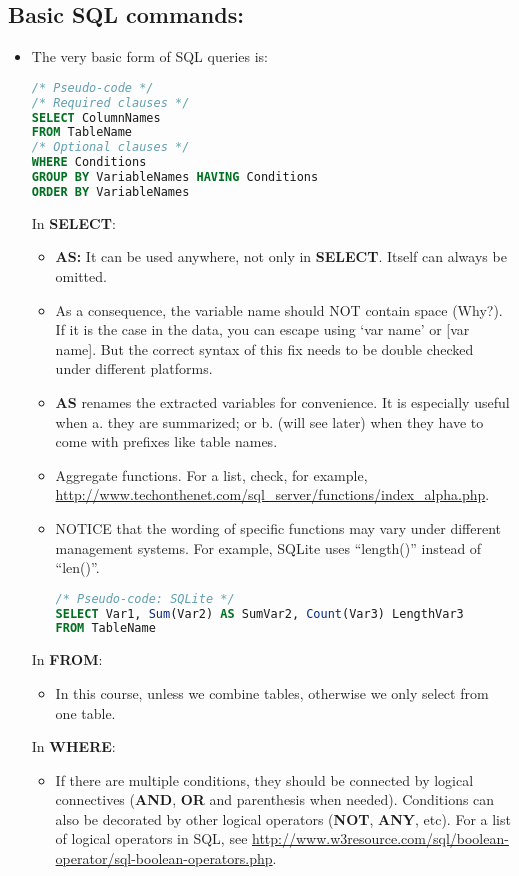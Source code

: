 \documentclass[12pt]{article}
\begin{document}
\subsection{Basic SQL commands:}
\begin{itemize}
	\item The very basic form of SQL queries is:
\begin{lstlisting}[style=displaycode, language=SQL]
/* Pseudo-code */
/* Required clauses */
SELECT ColumnNames
FROM TableName
/* Optional clauses */
WHERE Conditions
GROUP BY VariableNames HAVING Conditions
ORDER BY VariableNames
\end{lstlisting}
	In {\bf SELECT}:
	\begin{itemize}[label=*]
		\item {\bf AS:} It can be used anywhere, not only in {\bf SELECT}. Itself can always be omitted.
		\item As a consequence, the variable name should NOT contain space (Why?). If it is the case in the data, you can escape using `var name' or [var name]. But the correct syntax of this fix needs to be double checked under different platforms.
		\item {\bf AS} renames the extracted variables for convenience. It is especially useful when a. they are summarized; or b. (will see later) when they have to come with prefixes like table names.
		\item Aggregate functions. For a list, check, for example, \url{http://www.techonthenet.com/sql_server/functions/index_alpha.php}.
		\item NOTICE that the wording of specific functions may vary under different management systems. For example, SQLite uses ``length()'' instead of ``len()''.
\begin{lstlisting}[style=displaycode, language=SQL]
/* Pseudo-code: SQLite */
SELECT Var1, Sum(Var2) AS SumVar2, Count(Var3) LengthVar3
FROM TableName
\end{lstlisting}
	\end{itemize}
	In {\bf FROM}:
	\begin{itemize}[label=*]
		\item In this course, unless we combine tables, otherwise we only select from one table.
	\end{itemize}
	In {\bf WHERE}:
	\begin{itemize}[label=*]
		\item If there are multiple conditions, they should be connected by logical connectives ({\bf AND}, {\bf OR} and parenthesis when needed). Conditions can also be decorated by other logical operators ({\bf NOT}, {\bf ANY}, etc). For a list of logical operators in SQL, see \url{http://www.w3resource.com/sql/boolean-operator/sql-boolean-operators.php}.

\end{itemize}
\end{itemize}
\end{document}
